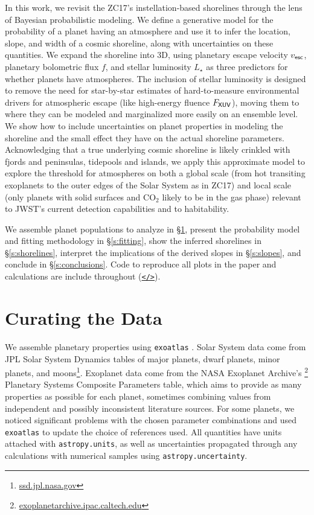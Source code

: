 \documentclass[modern,linenumbers,trackchanges]{aastex7}
\begin{document}
In this work, we revisit the ZC17's instellation-based shorelines through the lens of Bayesian probabilistic modeling. We define a generative model for the probability of a planet having an atmosphere and use it to infer the location, slope, and width of a cosmic shoreline, along with uncertainties on these quantities. We expand the shoreline into 3D, using planetary escape velocity $v_{\sf esc}$, planetary bolometric flux $f$, and stellar luminosity $L_\star$ as three predictors for whether planets have atmospheres. The inclusion of stellar luminosity is designed to remove the need for star-by-star estimates of hard-to-measure environmental drivers for atmospheric escape (like high-energy fluence $F_{\sf XUV}$), moving them to where they can be modeled and marginalized more easily on an ensemble level. We show how to include uncertainties on planet properties in modeling the shoreline and the small effect they have on the actual shoreline parameters. Acknowledging that a true underlying cosmic shoreline is likely crinkled with fjords and peninsulas, tidepools and islands, we apply this approximate model to explore the threshold for atmospheres on both a global scale (from hot transiting exoplanets to the outer edges of the Solar System as in ZC17) and local scale (only planets with solid surfaces and CO$_2$ likely to be in the gas phase) relevant to JWST's current detection capabilities and to habitability.

We assemble planet populations to analyze in \S\ref{s:data}, present the probability model and fitting methodology in \S\ref{s:fitting},  show the inferred shorelines in \S\ref{s:shorelines}, interpret the implications of the derived slopes in \S\ref{s:slopes}, and conclude in \S\ref{s:conclusions}. Code to reproduce all plots in the paper and calculations are include throughout (\href{https://github.com/zkbt/shoreline}{\texttt{</>}}).

\section{Curating the Data}
\label{s:data}

We assemble planetary properties using \texttt{exoatlas} \citep{berta-thompsonZkbtExoatlas2025}. Solar System data come from JPL Solar System Dynamics tables of major planets, dwarf planets, minor planets, and moons\footnote{\href{https://ssd.jpl.nasa.gov}{ssd.jpl.nasa.gov}}. Exoplanet data come from the NASA Exoplanet Archive's \citep{christiansenNASAExoplanetArchive2025}\footnote{\href{https://exoplanetarchive.ipac.caltech.edu}{exoplanetarchive.ipac.caltech.edu}} Planetary Systems Composite Parameters table, which aims to provide as many properties as possible for each planet, sometimes combining values from independent and possibly inconsistent literature sources. For some planets, we noticed significant problems with the chosen parameter combinations and used \texttt{exoatlas} to update the choice of references used. All quantities have units attached with \texttt{astropy.units}, as well as uncertainties propagated through any calculations with numerical samples using \texttt{astropy.uncertainty}. %
\end{document}
